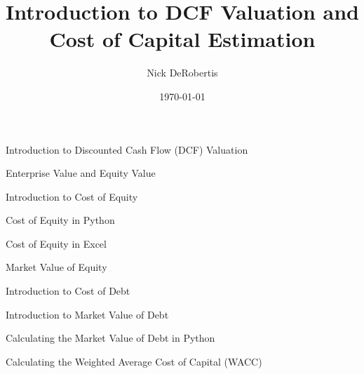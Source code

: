 \documentclass[]{article}
\begin{document}
\title{Introduction to DCF Valuation and Cost of Capital Estimation}
\author{Nick DeRobertis}
\date{\today}
\maketitle
\begin{section}{Introduction to Discounted Cash Flow (DCF) Valuation}

\end{section}
\begin{section}{Enterprise Value and Equity Value}

\end{section}
\begin{section}{Introduction to Cost of Equity}

\end{section}
\begin{section}{Cost of Equity in Python}

\end{section}
\begin{section}{Cost of Equity in Excel}

\end{section}
\begin{section}{Market Value of Equity}

\end{section}
\begin{section}{Introduction to Cost of Debt}

\end{section}
\begin{section}{Introduction to Market Value of Debt}

\end{section}
\begin{section}{Calculating the Market Value of Debt in Python}

\end{section}
\begin{section}{Calculating the Weighted Average Cost of Capital (WACC)}

\end{section}
\end{document}
